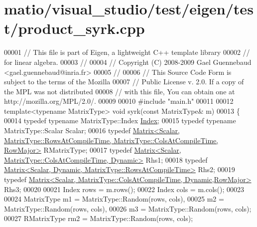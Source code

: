 \hypertarget{matio_2visual__studio_2test_2eigen_2test_2product__syrk_8cpp_source}{}\section{matio/visual\+\_\+studio/test/eigen/test/product\+\_\+syrk.cpp}
\label{matio_2visual__studio_2test_2eigen_2test_2product__syrk_8cpp_source}

\begin{DoxyCode}
00001 \textcolor{comment}{// This file is part of Eigen, a lightweight C++ template library}
00002 \textcolor{comment}{// for linear algebra.}
00003 \textcolor{comment}{//}
00004 \textcolor{comment}{// Copyright (C) 2008-2009 Gael Guennebaud <gael.guennebaud@inria.fr>}
00005 \textcolor{comment}{//}
00006 \textcolor{comment}{// This Source Code Form is subject to the terms of the Mozilla}
00007 \textcolor{comment}{// Public License v. 2.0. If a copy of the MPL was not distributed}
00008 \textcolor{comment}{// with this file, You can obtain one at http://mozilla.org/MPL/2.0/.}
00009 
00010 \textcolor{preprocessor}{#include "main.h"}
00011 
00012 \textcolor{keyword}{template}<\textcolor{keyword}{typename} MatrixType> \textcolor{keywordtype}{void} syrk(\textcolor{keyword}{const} MatrixType& m)
00013 \{
00014   \textcolor{keyword}{typedef} \textcolor{keyword}{typename} MatrixType::Index \hyperlink{namespace_eigen_a62e77e0933482dafde8fe197d9a2cfde}{Index};
00015   \textcolor{keyword}{typedef} \textcolor{keyword}{typename} MatrixType::Scalar Scalar;
00016   \textcolor{keyword}{typedef} 
      \hyperlink{group___core___module_class_eigen_1_1_matrix}{Matrix<Scalar, MatrixType::RowsAtCompileTime, MatrixType::ColsAtCompileTime, RowMajor>}
       RMatrixType;
00017   \textcolor{keyword}{typedef} \hyperlink{group___core___module_class_eigen_1_1_matrix}{Matrix<Scalar, MatrixType::ColsAtCompileTime, Dynamic>}
       Rhs1;
00018   \textcolor{keyword}{typedef} \hyperlink{group___core___module_class_eigen_1_1_matrix}{Matrix<Scalar, Dynamic, MatrixType::RowsAtCompileTime>}
       Rhs2;
00019   \textcolor{keyword}{typedef} \hyperlink{group___core___module_class_eigen_1_1_matrix}{Matrix<Scalar, MatrixType::ColsAtCompileTime, Dynamic,RowMajor>}
       Rhs3;
00020 
00021   Index rows = m.rows();
00022   Index cols = m.cols();
00023 
00024   MatrixType m1 = MatrixType::Random(rows, cols),
00025              m2 = MatrixType::Random(rows, cols),
00026              m3 = MatrixType::Random(rows, cols);
00027   RMatrixType rm2 = MatrixType::Random(rows, cols);

\end{DoxyCode}
